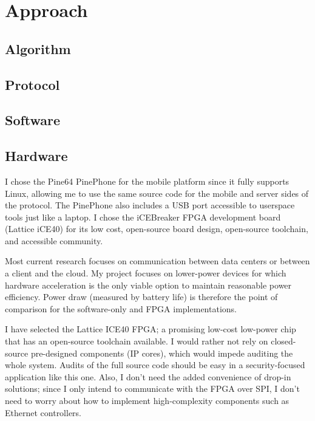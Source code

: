 \section{Approach}

\subsection{Algorithm}

\subsection{Protocol}

\subsection{Software}

\subsection{Hardware}
I chose the Pine64 PinePhone for the mobile platform since it fully supports Linux, allowing me to use the same source code for the mobile and server sides of the protocol. The PinePhone also includes a USB port accessible to userspace tools just like a laptop. I chose the iCEBreaker FPGA development board (Lattice iCE40) for its low cost, open-source board design, open-source toolchain, and accessible community.

Most current research focuses on communication between data centers or between a client and the cloud. My project focuses on lower-power devices for which hardware acceleration is the only viable option to maintain reasonable power efficiency. Power draw (measured by battery life) is therefore the point of comparison for the software-only and FPGA implementations.

I have selected the Lattice ICE40 FPGA; a promising low-cost low-power chip that has an open-source toolchain available. I would rather not rely on closed-source pre-designed components (IP cores), which would impede auditing the whole system. Audits of the full source code should be easy in a security-focused application like this one. Also, I don't need the added convenience of drop-in solutions; since I only intend to communicate with the FPGA over SPI, I don't need to worry about how to implement high-complexity components such as Ethernet controllers.
